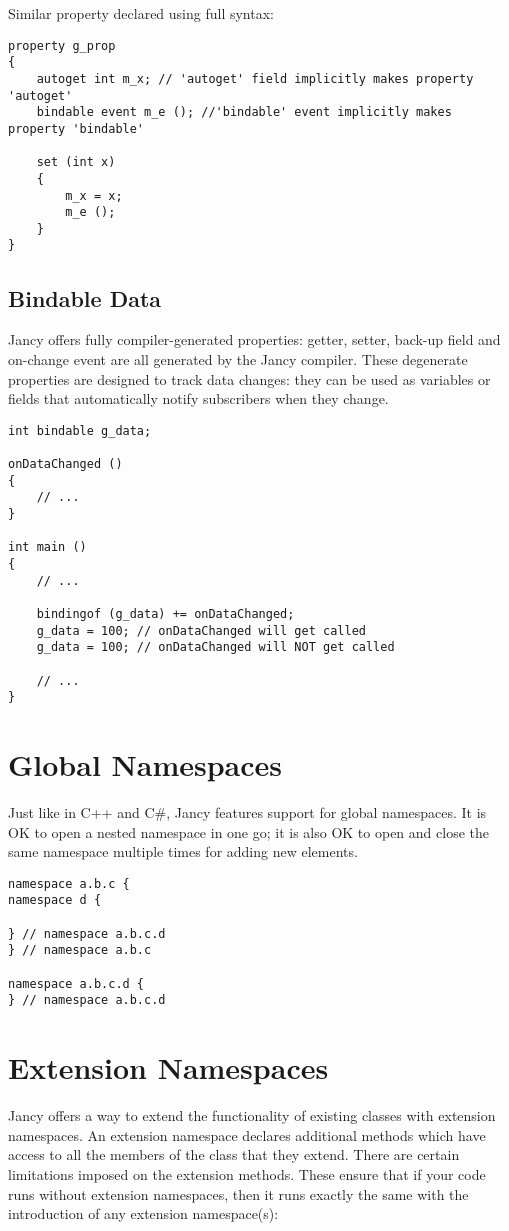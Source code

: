 \documentclass[oneside]{book}
\begin{document}
Similar property declared using full syntax:

\begin{lstlisting}
property g_prop
{   
    autoget int m_x; // 'autoget' field implicitly makes property 'autoget'
    bindable event m_e (); //'bindable' event implicitly makes property 'bindable'

    set (int x)
    {
        m_x = x;
        m_e ();
    }
}
\end{lstlisting}

\subsection{Bindable Data}
Jancy offers fully compiler-generated properties: getter, setter, back-up field and on-change event are all generated by the Jancy compiler. These degenerate properties are designed to track data changes: they can be used as variables or fields that automatically notify subscribers when they change.

\begin{lstlisting}
int bindable g_data;

onDataChanged ()
{
    // ...
}

int main ()
{
    // ...

    bindingof (g_data) += onDataChanged;
    g_data = 100; // onDataChanged will get called
    g_data = 100; // onDataChanged will NOT get called

    // ...
}
\end{lstlisting}

\section{Global Namespaces}

Just like in C++ and C\#, Jancy features support for global namespaces. It is OK to open a nested namespace in one go; it is also OK to open and close the same namespace multiple times for adding new elements.

\begin{lstlisting}
namespace a.b.c {
namespace d {

} // namespace a.b.c.d
} // namespace a.b.c 

namespace a.b.c.d {
} // namespace a.b.c.d 
\end{lstlisting}

\section{Extension Namespaces}
Jancy offers a way to extend the functionality of existing classes with extension namespaces. An extension namespace declares additional methods which have access to all the members of the class that they extend. There are certain limitations imposed on the extension methods. These ensure that if your code runs without extension namespaces, then it runs exactly the same with the introduction of any extension namespace(s):
\end{document}
